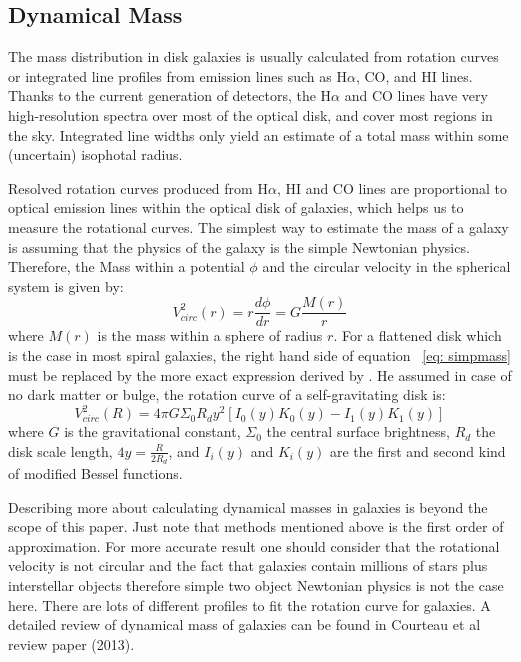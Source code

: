 \subsection{Dynamical Mass}
The mass distribution in disk galaxies is usually calculated from rotation curves or integrated line profiles from emission lines such as H${\alpha}$, CO, and HI lines. Thanks to the current generation of detectors, the H$\alpha$ and CO lines have very high-resolution spectra over most of the optical disk, and cover most regions in the sky. Integrated line widths only yield an estimate of a total mass within some (uncertain) isophotal radius.

Resolved rotation curves produced from H$\alpha$, HI and CO lines are proportional to optical emission lines within the optical disk of galaxies, \citep{Courteau13} which helps us to measure the rotational curves. The simplest way to estimate the mass of a galaxy is assuming that the physics of the galaxy is the simple Newtonian physics. Therefore, the Mass within a potential $\phi$ and the circular velocity in the spherical system is given by:
\begin{equation}
\label{eq: simpmass}
V^2_{circ}(r)=r\frac{d\phi}{dr} = G\frac{M(r)}{r}
\end{equation}
where $M(r)$ is the mass within a sphere of radius $r$. For a flattened disk which is the case in most spiral galaxies, the right hand side of equation {~\ref{eq: simpmass}}  must  be replaced by the more exact expression derived by \cite{Freeman70}. He assumed in case of no dark matter or bulge, the rotation curve of a self-gravitating disk is:
\begin{equation}
V^2_{circ}(R)= 4\pi G \Sigma_{0}R_{d} y^2[I_0(y)K_0(y) - I_1(y)K_1(y)]
\end{equation}
where $G$ is the gravitational constant, $\Sigma_0$ the central surface brightness, $R_d$ the disk scale length, $4y=\frac{R}{2R_d}$, and $I_i(y)$ and $K_i(y)$ are the first and second kind of modified Bessel functions.

Describing more about calculating dynamical masses in galaxies is beyond the scope of this paper. Just note that methods mentioned above is the first order of approximation. For more accurate result one should consider that the rotational velocity is not circular and the fact that galaxies contain millions of stars plus interstellar objects therefore simple two object Newtonian physics is not the case here. There are lots of different profiles to fit the rotation curve for galaxies. A detailed review of dynamical mass of galaxies can be found in Courteau et al review paper (2013).

